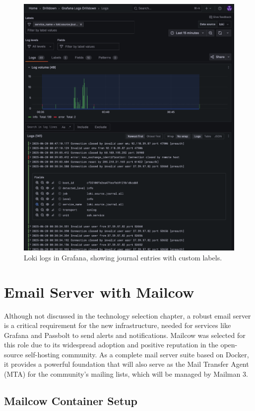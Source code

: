 \begin{figure}[H]
	\centering
	\includegraphics[width=\textwidth]{imaxes/grafana-journal.png}
	\caption{Loki logs in Grafana, showing journal entries with custom labels.}
	\label{fig:grafana-journal}
\end{figure}

\section{Email Server with Mailcow}
\label{sec:mailcow}

Although not discussed in the technology selection chapter, a robust email server is a critical requirement for the new infrastructure, needed for services like Grafana and Passbolt to send alerts and notifications. Mailcow was selected for this role due to its widespread adoption and positive reputation in the open-source self-hosting community. As a complete mail server suite based on Docker, it provides a powerful foundation that will also serve as the Mail Transfer Agent (MTA) for the community's mailing lists, which will be managed by Mailman 3.

\subsection*{Mailcow Container Setup}


